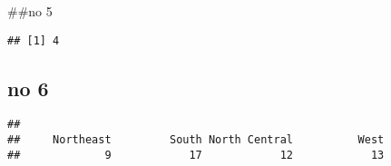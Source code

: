 \documentclass[
]{article}
\newenvironment{Shaded}{\begin{snugshade}}{\end{snugshade}}
\newcommand{\FunctionTok}[1]{\textcolor[rgb]{0.00,0.00,0.00}{#1}}
\newcommand{\NormalTok}[1]{#1}
\newcommand{\SpecialCharTok}[1]{\textcolor[rgb]{0.00,0.00,0.00}{#1}}
\begin{document}
\#\#no 5

\begin{Shaded}
\end{Shaded}

\begin{verbatim}
## [1] 4
\end{verbatim}

\hypertarget{no-6}{%
\subsection{no 6}\label{no-6}}

\begin{Shaded}
\end{Shaded}

\begin{verbatim}
## 
##     Northeast         South North Central          West 
##             9            17            12            13
\end{verbatim}
\end{document}
